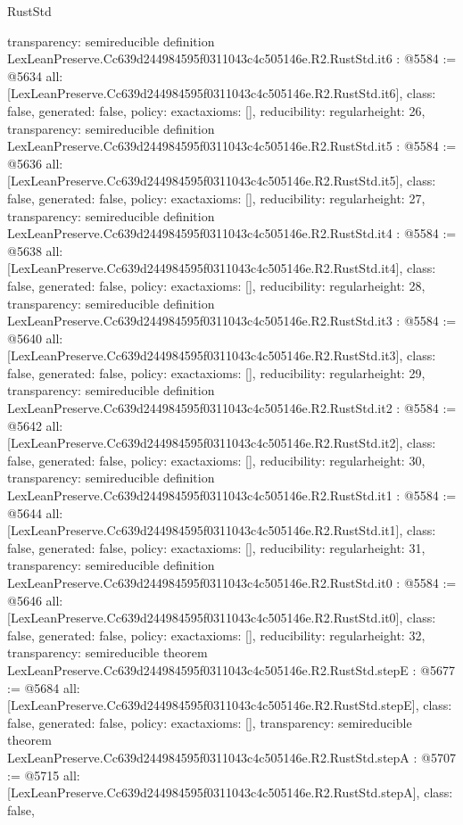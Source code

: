 \begin{lexlean}{RustStd}
\begin{coremodule}
{  transparency: semireducible
}
definition LexLeanPreserve.Cc639d244984595f0311043c4c505146e.R2.RustStd.it6 : @5584 := @5634 {
  all: [LexLeanPreserve.Cc639d244984595f0311043c4c505146e.R2.RustStd.it6],
  class: false,
  generated: false,
  policy: exact{axioms: []},
  reducibility: regular{height: 26},
  transparency: semireducible
}
definition LexLeanPreserve.Cc639d244984595f0311043c4c505146e.R2.RustStd.it5 : @5584 := @5636 {
  all: [LexLeanPreserve.Cc639d244984595f0311043c4c505146e.R2.RustStd.it5],
  class: false,
  generated: false,
  policy: exact{axioms: []},
  reducibility: regular{height: 27},
  transparency: semireducible
}
definition LexLeanPreserve.Cc639d244984595f0311043c4c505146e.R2.RustStd.it4 : @5584 := @5638 {
  all: [LexLeanPreserve.Cc639d244984595f0311043c4c505146e.R2.RustStd.it4],
  class: false,
  generated: false,
  policy: exact{axioms: []},
  reducibility: regular{height: 28},
  transparency: semireducible
}
definition LexLeanPreserve.Cc639d244984595f0311043c4c505146e.R2.RustStd.it3 : @5584 := @5640 {
  all: [LexLeanPreserve.Cc639d244984595f0311043c4c505146e.R2.RustStd.it3],
  class: false,
  generated: false,
  policy: exact{axioms: []},
  reducibility: regular{height: 29},
  transparency: semireducible
}
definition LexLeanPreserve.Cc639d244984595f0311043c4c505146e.R2.RustStd.it2 : @5584 := @5642 {
  all: [LexLeanPreserve.Cc639d244984595f0311043c4c505146e.R2.RustStd.it2],
  class: false,
  generated: false,
  policy: exact{axioms: []},
  reducibility: regular{height: 30},
  transparency: semireducible
}
definition LexLeanPreserve.Cc639d244984595f0311043c4c505146e.R2.RustStd.it1 : @5584 := @5644 {
  all: [LexLeanPreserve.Cc639d244984595f0311043c4c505146e.R2.RustStd.it1],
  class: false,
  generated: false,
  policy: exact{axioms: []},
  reducibility: regular{height: 31},
  transparency: semireducible
}
definition LexLeanPreserve.Cc639d244984595f0311043c4c505146e.R2.RustStd.it0 : @5584 := @5646 {
  all: [LexLeanPreserve.Cc639d244984595f0311043c4c505146e.R2.RustStd.it0],
  class: false,
  generated: false,
  policy: exact{axioms: []},
  reducibility: regular{height: 32},
  transparency: semireducible
}
theorem LexLeanPreserve.Cc639d244984595f0311043c4c505146e.R2.RustStd.stepE : @5677 := @5684 {
  all: [LexLeanPreserve.Cc639d244984595f0311043c4c505146e.R2.RustStd.stepE],
  class: false,
  generated: false,
  policy: exact{axioms: []},
  transparency: semireducible
}
theorem LexLeanPreserve.Cc639d244984595f0311043c4c505146e.R2.RustStd.stepA : @5707 := @5715 {
  all: [LexLeanPreserve.Cc639d244984595f0311043c4c505146e.R2.RustStd.stepA],
  class: false,
}
\end{coremodule}
\end{lexlean}
